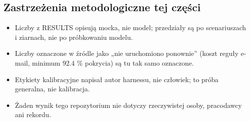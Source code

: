 \subsection{Zastrzeżenia metodologiczne tej części}

\begin{itemize}[leftmargin=*,itemsep=2pt]
  \item Liczby z RESULTS opisują mocka, nie model; przedziały są po scenariuszach i ziarnach, nie po próbkowaniu modelu.
  \item Liczby oznaczone w źródle jako „nie uruchomiono ponownie” (koszt reguły e-mail, minimum 92.4 \% pokrycia) są tu tak samo oznaczone.
  \item Etykiety kalibracyjne napisał autor harnessu, nie człowiek; to próba generalna, nie kalibracja.
  \item Żaden wynik tego repozytorium nie dotyczy rzeczywistej osoby, pracodawcy ani rekordu.
\end{itemize}
